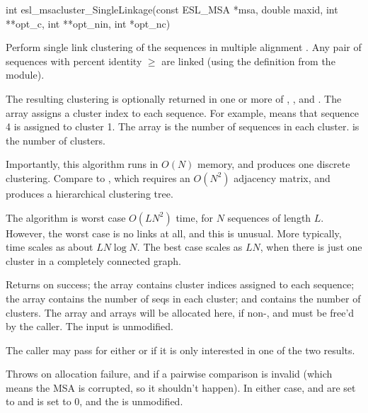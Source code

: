 \begin{sreapi}
\hypertarget{func:esl_msacluster_SingleLinkage()}
{\item[int esl\_msacluster\_SingleLinkage(const ESL\_MSA *msa, double maxid, 
			     int **opt\_c, int **opt\_nin, int *opt\_nc)]}

Perform single link clustering of the sequences in 
multiple alignment . Any pair of sequences with
percent identity $\geq$  are linked (using
the definition from the  module).

The resulting clustering is optionally returned in one
or more of , , and .  The
 array assigns a cluster index
 to each sequence. For example, 
means that sequence 4 is assigned to cluster 1.  The
 array is the number of sequences
in each cluster.  is the number of clusters.

Importantly, this algorithm runs in $O(N)$ memory, and
produces one discrete clustering. Compare to
, which requires an $O(N^2)$ 
adjacency matrix, and produces a hierarchical clustering
tree.

The algorithm is worst case $O(LN^2)$ time, for $N$
sequences of length $L$. However, the worst case is no
links at all, and this is unusual. More typically, time
scales as about $LN \log N$. The best case scales as
$LN$, when there is just one cluster in a completely
connected graph.

Returns  on success; the  array contains
cluster indices  assigned to each sequence; the
 array contains the number of seqs in
each cluster; and  contains the number of
clusters. The  array and  arrays will be
allocated here, if non-, and must be free'd by the
caller. The input  is unmodified.

The caller may pass  for either  or
 if it is only interested in one of the two
results.

Throws  on allocation failure, and  if a pairwise
comparison is invalid (which means the MSA is corrupted, so it
shouldn't happen). In either case,  and  are set to 
and  is set to 0, and the  is unmodified.


\end{sreapi}

